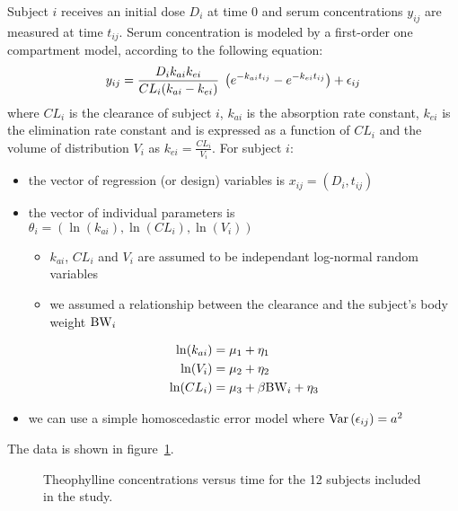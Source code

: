 Subject $i$ receives an initial dose $D_i$ at time 0 and serum concentrations $y_{ij}$ are measured at time $t_{ij}$. Serum concentration is modeled by a first-order one compartment model, according to the following equation:
\begin{equation}
y_{ij} = \frac{\displaystyle D_i k_{ai} k_{ei}}{CL_i (k_{ai} - k_{ei})} \; \left( e^{-k_{ai} t_{ij}} - e^{-k_{ei} t_{ij}} \right) + \epsilon_{ij}
\end{equation}
where $CL_i$ is the clearance of subject $i$, $k_{ai}$ is the absorption rate constant, $k_{ei}$ is the elimination rate constant and is expressed as a function of $CL_i$ and the volume of distribution $V_i$ as $k_{ei}=\frac{CL_i}{V_i}$. For subject $i$:
\begin{itemize}
\item the vector of regression (or design) variables is $x_{ij} = (D_i , t_{ij} )$
\item the vector of individual parameters is $\theta_i = \left(\ln(k_{ai} ), \ln(CL_i), \ln(V_i) \right)$
   \begin{itemize}
   \item $k_{ai}$, $CL_{i}$ and $V_i$ are assumed to be independant log-normal random variables
   \item we assumed a relationship between the clearance and the subject's body weight ${\rm BW}_i$
   \end{itemize}
\begin{equation}
\begin{split}
\ln(k_{ai}) &= \mu_1 + \eta_1 \\
\ln(V_{i}) &= \mu_2 + \eta_2 \\
\ln(CL_{i}) &= \mu_3 + \beta {\rm BW}_i + \eta_3 \\
\end{split}
\end{equation}
\item we can use a simple homoscedastic error model where $\mbox{Var}\left(\epsilon_{ij}\right)=a^2$
\end{itemize}

The data is shown in figure~\ref{fig:theodata}.

\begin{figure}[!h]
\begin{center}
\par \kern -1cm
\end{center}
\par \kern -0.5cm
\caption{Theophylline concentrations versus time for the 12 subjects included in the study.} \label{fig:theodata}
\end{figure}

